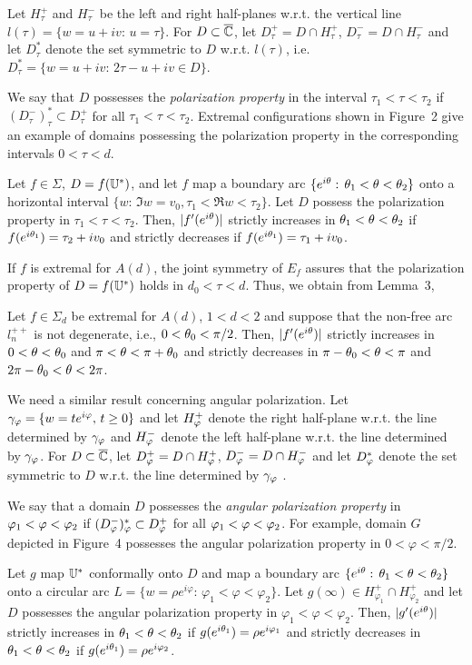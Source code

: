 Let $H_\tau^+$ and $H_\tau^-$ be the left and right half-planes w.r.t. the vertical line $l(\tau)=\{w=u+iv:\,u=\tau\}$.
For $D\subset \overline{{\Bbb {C}}}$, let $D_\tau^+=D\cap H_\tau^+$, $D_\tau^-=D\cap H_\tau^-$ and let $D_\tau^*$ denote the set symmetric
to $D$ w.r.t. $l(\tau)$, i.e. $D^*_\tau=\{w=u+iv:\, 2\tau-u+iv\in D\}$.

We say that $D$ possesses the {\it polarization property} in the interval $\tau_1<\tau<\tau_2$ if $(D_\tau^-)_\tau^*\subset D_\tau^+$
for all $\tau_1<\tau<\tau_2$. Extremal configurations shown in Figure~2 give an example of domains possessing the polarization
property in the corresponding intervals $0<\tau<d$.

\bl \cite[Lemma 4]{BS}
Let $f\in \Sigma$, $D=f({\Bbb{U}}^*)$, and let $f$ map a boundary arc $\{ e^{i\theta}:\, \theta_1<\theta<\theta_2\}$ onto a horizontal interval 
$\{w:\, \Im w=v_0,\tau_1<\Re w<\tau_2\}$. Let $D$ possess the polarization property in $\tau_1<\tau<\tau_2$. Then, 
$|f'(e^{i\theta})|$ strictly increases in $\theta_1<\theta<\theta_2$ if $f(e^{i\theta_1})=\tau_2+iv_0$ and strictly decreases if $f(e^{i\theta_1})=\tau_1+iv_0$.
\el

If $f$ is extremal for $A(d)$, the joint symmetry of $E_f$ assures that the polarization property of $D=f({\Bbb{U}}^*)$ holds in
$d_0<\tau<d$. Thus, we obtain from Lemma~3,

\bc
Let $f\in \Sigma_d$ be extremal for $A(d)$, $1<d<2$ and suppose that the non-free arc $l_n^{++}$ is not  degenerate, i.e., $0<\theta_0<\pi/2$.
Then, $|f'(e^{i\theta})|$ strictly increases in $0<\theta<\theta_0$ and $\pi<\theta <\pi+\theta_0$ and strictly decreases in $\pi-\theta_0<\theta<\pi$ 
and $2\pi - \theta_0<\theta< 2\pi$.
\ec

We need  a similar result concerning angular polarization. Let $\gamma_\varphi=\{w=te^{i\varphi}, \, t\ge 0\}$ and let 
$H_\varphi^+$ denote the right half-plane w.r.t. the line determined by $\gamma_\varphi$ and
$H_\varphi^-$ denote the left half-plane w.r.t. the line determined by $\gamma_\varphi$.
For $D\subset \overline{{\Bbb {C}}}$, let $D_\varphi^+=D\cap H_\varphi^+$, $D_\varphi^-=D\cap H_\varphi^-$ and let $D_\varphi^*$ denote the set symmetric
to $D$ w.r.t. the line determined by $\gamma_\varphi$ .

We say that a domain $D$ possesses the {\it angular polarization property} in $\varphi_1<\varphi<\varphi_2$ if 
$(D_\varphi^-)_\varphi^*\subset D_\varphi^+$ for all $\varphi_1<\varphi<\varphi_2$.  For example, domain $G$ depicted in 
Figure~4 possesses the angular polarization property in $0<\varphi <\pi/2$.

\bl \cite[Lemma~5]{BS}
Let $g$ map ${\Bbb{U}}^*$ conformally onto $D$ and map a boundary arc $\{e^{i\theta}:\, \theta_1<\theta <\theta_2\}$ onto a circular arc
$L=\{w=\rho e^{i\varphi}:\, \varphi_1<\varphi<\varphi_2\}$. Let $g(\infty)\in H_{\varphi_1}^+\cap H_{\varphi_2}^+$ and
let $D$ possesses the angular polarization property in $\varphi_1<\varphi<\varphi_2$. Then, $|g'(e^{i\theta})|$ strictly
increases in $\theta_1<\theta<\theta_2$ if $g(e^{i\theta_1})= \rho e^{i\varphi_1}$ and strictly decreases in $\theta_1<\theta<\theta_2$
if $g(e^{i\theta_1})=\rho e^{i\varphi_2}$.
\el


